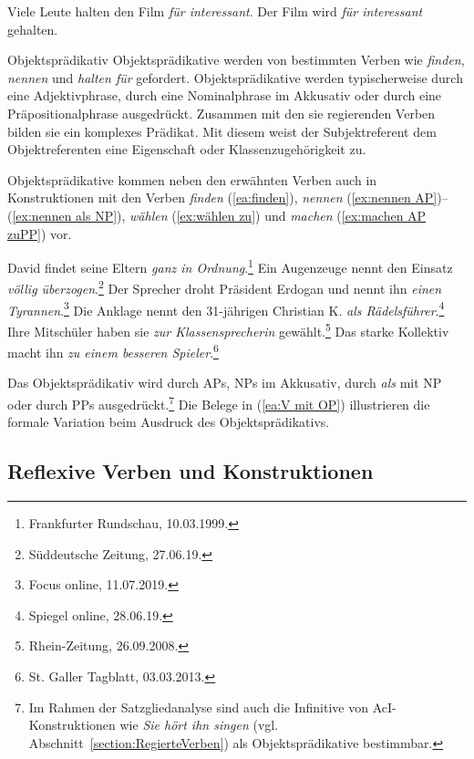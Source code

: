 \ea \label{ea:OP Passiv}
\ea \label{ea:OP aktiv} Viele Leute halten den Film \textit{für interessant}.
\ex \label{ex:OP pass SP} Der Film wird \textit{für interessant} gehalten.
\z 
\z 

\begin{Definition}{Objektsprädikativ}
    \largerpage
\noindent Objektsprädikative werden von bestimmten Verben wie \textit{finden}, \textit{nennen} und \textit{halten für} gefordert. Objektsprädikative werden typischerweise durch eine Adjektivphrase, durch eine Nominalphrase im Akkusativ oder durch eine Präpositionalphrase ausgedrückt. Zusammen mit den sie regierenden Verben bilden sie ein komplexes Prädikat. Mit diesem weist der Subjektreferent dem Objektreferenten eine Eigenschaft oder Klassenzugehörigkeit zu.   
\end{Definition}



Objektsprädikative kommen neben den erwähnten Verben auch \ua in Konstruktionen mit den Verben \textit{finden} (\ref{ea:finden}), \textit{nennen} (\ref{ex:nennen AP})--(\ref{ex:nennen als NP}), \textit{wählen} (\ref{ex:wählen zu}) und \textit{machen} (\ref{ex:machen AP zuPP}) vor. 

\ea \label{ea:V mit OP}
\ea \label{ea:finden} David findet seine Eltern \textit{ganz in Ordnung}.\footnote{Frankfurter Rundschau, 10.03.1999.}
\ex \label{ex:nennen AP} Ein Augenzeuge nennt den Einsatz \textit{völlig überzogen}.\footnote{Süddeutsche Zeitung, 27.06.19.}
\ex \label{ex:nennen NP} Der Sprecher droht Präsident Erdogan und nennt ihn \textit{einen Tyrannen}.\footnote{Focus online, 11.07.2019.}
\ex \label{ex:nennen als NP} Die Anklage nennt den 31-jährigen Christian K. \textit{als Rädelsführer}.\footnote{Spiegel online, 28.06.19.}
\ex \label{ex:wählen zu} Ihre Mitschüler haben sie \textit{zur Klassensprecherin} gewählt.\footnote{Rhein-Zeitung, 26.09.2008.}
\ex \label{ex:machen AP zuPP} Das starke Kollektiv macht ihn \textit{zu einem besseren Spieler}.\footnote{St. Galler Tagblatt, 03.03.2013.}
\z 
\z 

Das Objektsprädikativ wird durch APs, NPs im Akkusativ, durch \textit{als} mit NP oder durch PPs ausgedrückt.\footnote{Im Rahmen der Satzgliedanalyse sind auch die Infinitive von AcI-Konstruktionen wie \textit{Sie hört ihn singen} (vgl. Abschnitt~\ref{section:RegierteVerben}) als Objektsprädikative bestimmbar.} Die Belege in (\ref{ea:V mit OP}) illustrieren die formale Variation beim Ausdruck des Objektsprädikativs.

\subsection{Reflexive Verben und Konstruktionen}\label{subsection:Reflexiva}

